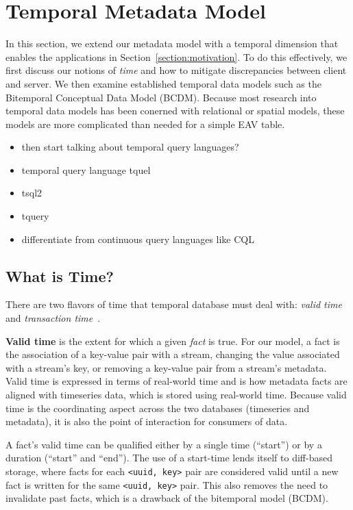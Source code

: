 \section{Temporal Metadata Model} \label{section:temporal}

In this section, we extend our metadata model with a temporal dimension that
enables the applications in Section~\ref{section:motivation}. To do this effectively, we first
discuss our notions of \emph{time} and how to mitigate discrepancies between client and server.
We then examine established temporal data models such as the Bitemporal Conceptual Data Model (BCDM).
Because most research into temporal data models has been conerned with relational or spatial models,
these models are more complicated than needed for a simple EAV table.

\begin{itemize}
\item then start talking about temporal query languages?
\item temporal query language tquel~\cite{snodgrass1987temporal}
\item tsql2~\cite{snodgrass2012tsql2}
\item tquery~\cite{kahn1991tquery}
\item differentiate from continuous query languages like CQL~\cite{arasu2006cql}
\end{itemize}

\subsection{What is Time?}

There are two flavors of time that temporal database must deal with:
\emph{valid time} and \emph{transaction time}~\cite{jensen1999temporal}. 

\textbf{Valid time} is the extent for which a given \emph{fact} is true. For
our model, a fact is the association of a key-value pair with a stream,
changing the value associated with a stream's key, or removing a key-value pair
from a stream's metadata. Valid time is expressed in terms of real-world time
and is how metadata facts are aligned with timeseries data, which is stored
using real-world time. Because valid time is the coordinating aspect across the
two databases (timeseries and metadata), it is also the point of interaction
for consumers of data.

A fact's valid time can be qualified either by a single time (``start'') or by
a duration (``start'' and ``end''). The use of a start-time lends itself to
diff-based storage, where facts for each \texttt{<uuid, key>} pair are
considered valid until a new fact is written for the same \texttt{<uuid, key>}
pair. This also removes the need to invalidate past facts, which is a drawback
of the bitemporal model (BCDM).

